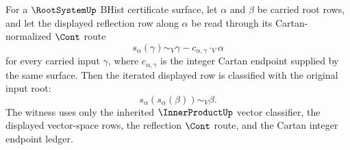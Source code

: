 \begin{theorem}
\label{thm:rootsystem-simple-reflection-involution-row}
For a $\RootSystemUp$ BHist certificate surface, let $\alpha$ and $\beta$ be carried root rows, and let the displayed reflection row along $\alpha$ be read through its Cartan-normalized $\Cont$ route
$$
s_\alpha(\gamma)
\sim_V
\gamma-c_{\alpha,\gamma}\cdot_V\alpha
$$
for every carried input $\gamma$, where $c_{\alpha,\gamma}$ is the integer Cartan endpoint supplied by the same surface. Then the iterated displayed row is classified with the original input root:
$$
s_\alpha(s_\alpha(\beta))\sim_V\beta.
$$
The witness uses only the inherited $\InnerProductUp$ vector classifier, the displayed vector-space rows, the reflection $\Cont$ route, and the Cartan integer endpoint ledger.
\end{theorem}
